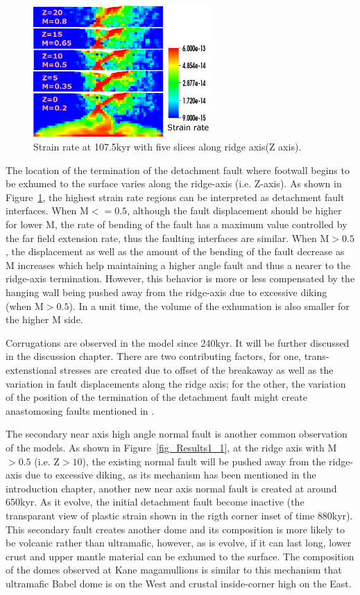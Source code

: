 \begin{figure}[H]
  \centering
    \includegraphics[width=0.6\textwidth]{fig_Results1_2.eps}
  \caption{Strain rate at 107.5kyr with five slices along ridge axis(Z axis).}
 \label{fig_Results1_2}
\end{figure}   

The location of the termination of the detachment fault where footwall begins to be exhumed to the surface varies along the ridge-axis (i.e. Z-axis). As shown in Figure~\ref{fig_Results1_2}, the highest strain rate regions can be interpreted as detachment fault interfaces. When M$<=0.5$, although the fault displacement should be higher for lower M, the rate of bending of the fault has a maximum value controlled by the far field extension rate, thus the faulting interfaces are similar. When M$>0.5$, the displacement as well as the amount of the bending of the fault decrease as M increases which help maintaining a higher angle fault and thus a nearer to the ridge-axis termination. However, this behavior is more or less compensated by the hanging wall being pushed away from the ridge-axis due to excessive diking (when M$>0.5$). In a unit time, the volume of the exhumation is also smaller for the higher M side.       

Corrugations are observed in the model since 240kyr. It will be further discussed in the discussion chapter. There are two contributing factors, for one, trans-extenstional stresses are created due to offset of the breakaway as well as the variation in fault displacements along the ridge axis; for the other, the variation of the position of the termination of the detachment fault might create anastomosing faults mentioned in \citep{Smith2014}.      

The secondary near axis high angle normal fault is another common observation of the models. As shown in Figure~\ref{fig_Results1_1}, at the ridge axis with M$>0.5$ (i.e. Z$>10$), the existing normal fault will be pushed away from the ridge-axis due to excessive diking, as its mechanism has been mentioned in the introduction chapter, another new near axis normal fault is created at around 650kyr. As it evolve, the initial detachment fault become inactive (the transparant view of plastic strain shown in the rigth corner inset of time 880kyr). This secondary fault creates another dome and its composition is more likely to be volcanic rather than ultramafic, however, as is evolve, if it can last long, lower crust and upper mantle material can be exhumed to the surface. The composition of the domes observed at Kane magamullions is similar to this mechanism that ultramafic Babel dome is on the West and crustal inside-corner high on the East.    

